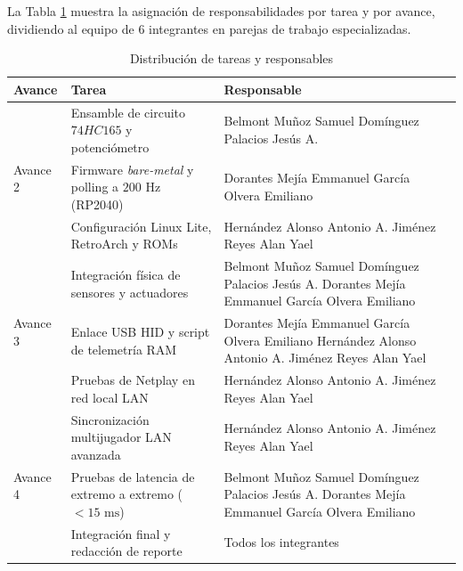 \documentclass[conference]{IEEEtran}
\begin{document}
La Tabla \ref{tab:tareas} muestra la asignación de responsabilidades por tarea y por avance, dividiendo al equipo de 6 integrantes en parejas de trabajo especializadas.

\begin{table}[H]
	\centering
	\caption{Distribución de tareas y responsables}
	\label{tab:tareas}
	\footnotesize %
	\begin{tabular}{|p{1.4cm}|p{3.4cm}|p{2.8cm}|}
		\hline
		\textbf{Avance} & \textbf{Tarea} & \textbf{Responsable} \\
		\hline
		\multirow{3}{*}{Avance 2} & Ensamble de circuito $74HC165$ y potenciómetro & Belmont Muñoz Samuel \newline Domínguez Palacios Jesús A. \\
		\cline{2-3}
		& Firmware \textit{bare-metal} y polling a $200\text{ Hz}$ (RP2040) & Dorantes Mejía Emmanuel \newline García Olvera Emiliano \\
		\cline{2-3}
		& Configuración Linux Lite, RetroArch y ROMs & Hernández Alonso Antonio A. \newline Jiménez Reyes Alan Yael \\
		\hline
		\multirow{3}{*}{Avance 3} & Integración física de sensores y actuadores & Belmont Muñoz Samuel \newline Domínguez Palacios Jesús A. \newline Dorantes Mejía Emmanuel \newline García Olvera Emiliano \\
		\cline{2-3}
		& Enlace USB HID y script de telemetría RAM & Dorantes Mejía Emmanuel \newline García Olvera Emiliano \newline Hernández Alonso Antonio A. \newline Jiménez Reyes Alan Yael \\
		\cline{2-3}
		& Pruebas de Netplay en red local LAN & Hernández Alonso Antonio A. \newline Jiménez Reyes Alan Yael \\
		\hline
		\multirow{3}{*}{Avance 4} & Sincronización multijugador LAN avanzada & Hernández Alonso Antonio A. \newline Jiménez Reyes Alan Yael \\
		\cline{2-3}
		& Pruebas de latencia de extremo a extremo ($< 15\text{ ms}$) & Belmont Muñoz Samuel \newline Domínguez Palacios Jesús A. \newline Dorantes Mejía Emmanuel \newline García Olvera Emiliano \\
		\cline{2-3}
		& Integración final y redacción de reporte & Todos los integrantes \\
		\hline
	\end{tabular}
\end{table}
\end{document}
